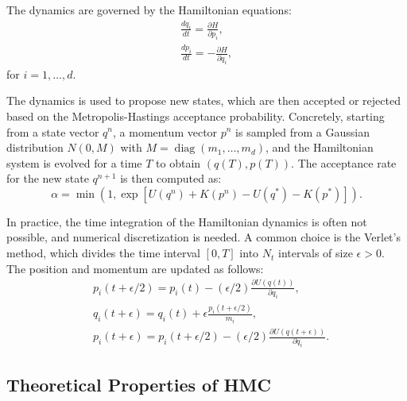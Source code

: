 \documentclass[a4paper, 12pt,oneside]{article}
\begin{document}
		The dynamics are governed by the Hamiltonian equations:
			\begin{gather}
			\frac{d q_i}{d t} =\frac{\partial H}{\partial p_i}, \\
			\frac{d p_i}{d t} =-\frac{\partial H}{\partial q_i},
			\end{gather}
			for $i=1, \ldots, d$.
		
			The dynamics is used to propose new states, which are then accepted or rejected based on the Metropolis-Hastings acceptance probability. Concretely, starting from a state vector $q^n$, a momentum vector $p^n$ is sampled from a Gaussian distribution $N(0, M)$ with $M=\operatorname{diag}\left(m_1, \ldots, m_d\right)$, and the Hamiltonian system is evolved for a time $T$ to obtain $(q(T), p(T))$. The acceptance rate for the new state $q^{n+1}$ is then computed as:
			\begin{equation}
				\alpha = \min\left(1, \exp \left[U\left(q^n\right)+K\left(p^n\right)-U\left(q^*\right)-K\left(p^*\right)\right]\right).
			\end{equation}

			In practice, the time integration of the Hamiltonian dynamics is often not possible, and numerical discretization is needed. A common choice is the Verlet's method, which divides the time interval $[0, T]$ into $N_t$ intervals of size $\epsilon>0$. The position and momentum are updated as follows:
			\begin{align}
				& p_i(t+\epsilon / 2)=p_i(t)-(\epsilon / 2) \frac{\partial U(q(t))}{\partial q_i}, \\
				& q_i(t+\epsilon)=q_i(t)+\epsilon \frac{p_i(t+\epsilon / 2)}{m_i}, \\
				& p_i(t+\epsilon)=p_i(t+\epsilon / 2)-(\epsilon / 2) \frac{\partial U(q(t+\epsilon))}{\partial q_i}.
				\end{align}	
			
			
	\subsection{Theoretical Properties of HMC}
\end{document}
